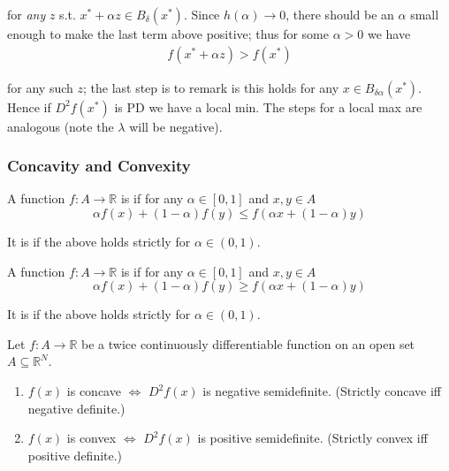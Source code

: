\documentclass{article}
\begin{document}
\begin{remark}
  for \textit{any} $z$ s.t. $x^* + \alpha z \in B_{\delta}(x^*)$. Since $h(\alpha) \to 0$, there should be an $\alpha$ small enough to make the last term above positive; thus for some $\alpha > 0$ we have
  \begin{align*}
    f(x^* + \alpha z) > f(x^*)
  \end{align*}

  for any such $z$; the last step is to remark is this holds for any $x \in B_{\delta \alpha}(x^*)$. Hence if $D^2f(x^*)$ is PD we have a local min. The steps for a local max are analogous (note the $\lambda$ will be negative).
\end{remark}

\subsubsection{Concavity and Convexity}
\label{ssub:concavity_and_convexity}

\begin{definition}
  A function $f: A \to \mathbb{R}$ is  if for any $\alpha \in [0, 1]$ and $x, y \in A$
  \[
    \alpha f(x) + (1 - \alpha) f(y)
    \le
    f(\alpha x + (1 - \alpha) y)
  \]

  It is  if the above holds strictly for $\alpha \in (0, 1)$.
\end{definition}

\begin{definition}
  A function $f: A \to \mathbb{R}$ is  if for any $\alpha \in [0, 1]$ and $x, y \in A$
  \[
    \alpha f(x) + (1 - \alpha) f(y)
    \ge
    f(\alpha x + (1 - \alpha) y)
  \]

  It is  if the above holds strictly for $\alpha \in (0, 1)$.
\end{definition}

\begin{theorem}
  Let $f: A \to \mathbb{R}$ be a twice continuously differentiable function on an open set $A \subseteq \mathbb{R}^N$.
  \begin{enumerate}
    \item $f(x)$ is concave $\iff$ $D^2f(x)$ is negative semidefinite. (Strictly concave iff negative definite.)
    \item $f(x)$ is convex $\iff$ $D^2f(x)$ is positive semidefinite. (Strictly convex iff positive definite.)
  \end{enumerate}
\end{theorem}
\end{document}
